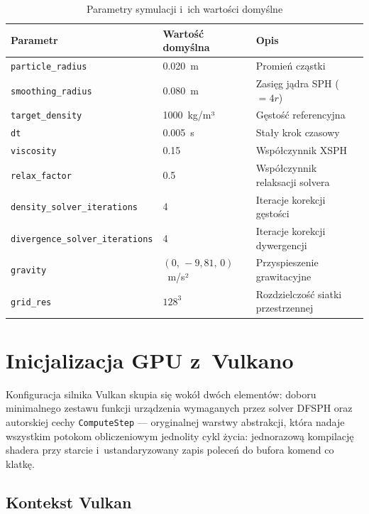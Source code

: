 \begin{table}[H]
\centering
\caption{Parametry symulacji i~ich wartości domyślne}
\label{tab:sim_params}
\begin{tabular}{p{4.0cm}ll}
\toprule
\textbf{Parametr} & \textbf{Wartość domyślna} & \textbf{Opis} \\
\midrule
\texttt{particle\_radius}   & 0.020~m       & Promień cząstki \\
\texttt{smoothing\_radius}  & 0.080~m       & Zasięg jądra SPH ($= 4r$) \\
\texttt{target\_density}    & 1000~kg/m³    & Gęstość referencyjna \\
\texttt{dt}                 & 0.005~s       & Stały krok czasowy \\
\texttt{viscosity}          & 0.15          & Współczynnik XSPH \\
\texttt{relax\_factor}      & 0.5           & Współczynnik relaksacji solvera \\
\texttt{density\_solver\_}\newline\texttt{iterations}    & 4 & Iteracje korekcji gęstości \\
\texttt{divergence\_solver\_}\newline\texttt{iterations} & 4 & Iteracje korekcji dywergencji \\
\texttt{gravity}            & $(0,\,-9{,}81,\,0)$~m/s² & Przyspieszenie grawitacyjne \\
\texttt{grid\_res}          & $128^3$       & Rozdzielczość siatki przestrzennej \\
\bottomrule
\end{tabular}
\end{table}



\section{Inicjalizacja GPU z~Vulkano}
\label{sec:gpu_init}

Konfiguracja silnika Vulkan skupia się wokół dwóch elementów:
doboru minimalnego zestawu funkcji urządzenia wymaganych przez solver
DFSPH oraz autorskiej cechy \texttt{ComputeStep} --- oryginalnej warstwy
abstrakcji, która nadaje wszystkim potokom obliczeniowym jednolity
cykl życia: jednorazową kompilację shadera przy starcie i~ustandaryzowany
zapis poleceń do bufora komend co klatkę.

\subsection{Kontekst Vulkan}
\label{subsec:vulkan_context}

